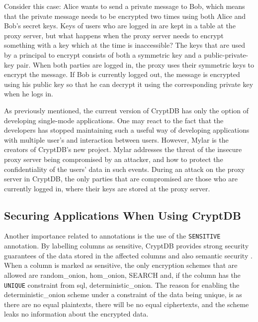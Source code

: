 Consider this case: Alice wants to send a private message to Bob, which means that the private message needs to be encrypted two times using both Alice and Bob's secret keys. Keys of users who are logged in are kept in a table at the proxy server, but what happens when the proxy server needs to encrypt something with a key which at the time is inaccessible? The keys that are used by a principal to encrypt consists of both a symmetric key and a public-private-key pair. When both parties are logged in, the proxy uses their symmetric keys to encrypt the message. If Bob is currently logged out, the message is encrypted using his public key so that he can decrypt it using the corresponding private key when he logs in.

As previously mentioned, the current version of CryptDB has only the option of developing single-mode applications. One may react to the fact that the developers has stopped maintaining such a useful way of developing applications with multiple user's and interaction between users. However, Mylar \cite{mylar_homepage} is the creators of CryptDB's new project. Mylar addresses the threat of the insecure proxy server being compromised by an attacker, and how to protect the confidentiality of the users' data in such events. During an attack on the proxy server in CryptDB, the only parties that are compromised are those who are currently logged in, where their keys are stored at the proxy server.


\subsection{Securing Applications When Using CryptDB}
\label{sec:sensitive}

Another importance related to annotations is the use of the \verb!SENSITIVE! annotation. By labelling columns as sensitive, CryptDB provides strong security guarantees of the data stored in the affected columns and also semantic security \cite{popa_thesis}. When a column is marked as sensitive, the only encryption schemes that are allowed are \gls{random_onion}, \gls{hom_onion}, SEARCH and, if the column has the \verb!UNIQUE! constraint from \gls{sql}, \gls{deterministic_onion}. The reason for enabling the \gls{deterministic_onion} scheme under a constraint of the data being unique, is as there are no equal plaintexts, there will be no equal ciphertexts, and the scheme leaks no information about the encrypted data.


